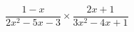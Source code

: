 \hspace*{2mm}\begin{minipage}[t]{\dimexpr\linewidth-2mm\relax}\vspace{0pt}
$\dfrac{1-x}{2x^2-5x-3}\times\dfrac{2x+1}{3x^2-4x+1}$\end{minipage}
